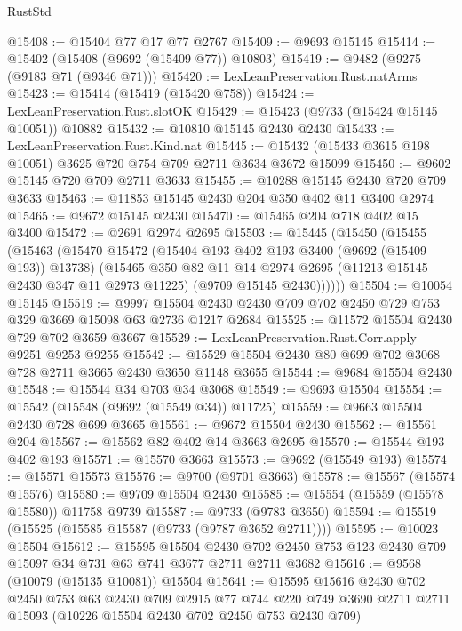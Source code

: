 \begin{lexlean}{RustStd}
\begin{coremodule}
{\begin{coremodule}
{{{{{{{{{{{{{{{{{{{{{{{{{{{{{{{{{{{{{{{{{{{{{{{{{{{{{{{@15408 := @15404 @77 @17 @77 @2767
@15409 := @9693 @15145
@15414 := @15402 (@15408 (@9692 (@15409 @77)) @10803)
@15419 := @9482 (@9275 (@9183 @71 (@9346 @71)))
@15420 := LexLeanPreservation.Rust.natArms
@15423 := @15414 (@15419 (@15420 @758))
@15424 := LexLeanPreservation.Rust.slotOK
@15429 := @15423 (@9733 (@15424 @15145 @10051)) @10882
@15432 := @10810 @15145 @2430 @2430
@15433 := LexLeanPreservation.Rust.Kind.nat
@15445 := @15432 (@15433 @3615 @198 @10051) @3625 @720 @754 @709 @2711 @3634 @3672 @15099
@15450 := @9602 @15145 @720 @709 @2711 @3633
@15455 := @10288 @15145 @2430 @720 @709 @3633
@15463 := @11853 @15145 @2430 @204 @350 @402 @11 @3400 @2974
@15465 := @9672 @15145 @2430
@15470 := @15465 @204 @718 @402 @15 @3400
@15472 := @2691 @2974 @2695
@15503 := @15445
    (@15450
      (@15455
        (@15463
          (@15470
            @15472
            (@15404 @193 @402 @193 @3400 (@9692 (@15409 @193)) @13738)
            (@15465
              @350
              @82
              @11
              @14
              @2974
              @2695
              (@11213 @15145 @2430 @347 @11 @2973 @11225)
              (@9709 @15145 @2430))))))
@15504 := @10054 @15145
@15519 := @9997 @15504 @2430 @2430 @709 @702 @2450 @729 @753 @329 @3669 @15098 @63 @2736 @1217 @2684
@15525 := @11572 @15504 @2430 @729 @702 @3659 @3667
@15529 := LexLeanPreservation.Rust.Corr.apply @9251 @9253 @9255
@15542 := @15529 @15504 @2430 @80 @699 @702 @3068 @728 @2711 @3665 @2430 @3650 @1148 @3655
@15544 := @9684 @15504 @2430
@15548 := @15544 @34 @703 @34 @3068
@15549 := @9693 @15504
@15554 := @15542 (@15548 (@9692 (@15549 @34)) @11725)
@15559 := @9663 @15504 @2430 @728 @699 @3665
@15561 := @9672 @15504 @2430
@15562 := @15561 @204
@15567 := @15562 @82 @402 @14 @3663 @2695
@15570 := @15544 @193 @402 @193
@15571 := @15570 @3663
@15573 := @9692 (@15549 @193)
@15574 := @15571 @15573
@15576 := @9700 (@9701 @3663)
@15578 := @15567 (@15574 @15576)
@15580 := @9709 @15504 @2430
@15585 := @15554 (@15559 (@15578 @15580)) @11758 @9739
@15587 := @9733 (@9783 @3650)
@15594 := @15519 (@15525 (@15585 @15587 (@9733 (@9787 @3652 @2711))))
@15595 := @10023 @15504
@15612 := @15595
    @15504
    @2430
    @702
    @2450
    @753
    @123
    @2430
    @709
    @15097
    @34
    @731
    @63
    @741
    @3677
    @2711
    @2711
    @3682
@15616 := @9568 (@10079 (@15135 @10081)) @15504
@15641 := @15595
    @15616
    @2430
    @702
    @2450
    @753
    @63
    @2430
    @709
    @2915
    @77
    @744
    @220
    @749
    @3690
    @2711
    @2711
    @15093
    (@10226 @15504 @2430 @702 @2450 @753 @2430 @709)
}}}}}}}}}}}}}}}}}}}}}}}}}}}}}}}}}}}}}}}}}}}}}}}}}}}}}}}
\end{coremodule}}
\end{coremodule}
\end{lexlean}
